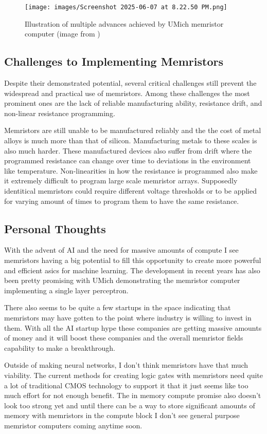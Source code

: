 \documentclass[sigconf]{acmart}
\begin{document}
\begin{figure}[h]
  \centering
  \texttt{[image: images/Screenshot 2025-06-07 at 8.22.50 PM.png]}
  \caption{Illustration of multiple advances achieved by UMich memristor computer (image from \cite{cai2019fully})}
\end{figure}

\subsection{Challenges to Implementing Memristors}
Despite their demonstrated potential, several critical challenges still
prevent the widespread and practical use of memristors. Among these challenges
the most prominent ones are the lack of reliable manufacturing ability,
resistance drift, and non-linear resistance programming. 

Memristors are still unable to be manufactured reliably and the 
the cost of metal alloys is much more than that of silicon. Manufacturing 
metals to these scales is also much harder. These manufactured devices also 
suffer from drift where the programmed resistance can change over time 
to deviations in the environment like temperature. Non-linearities 
in how the resistance is programmed also make it extremely difficult to
program large scale memristor arrays. Supposedly identitical memristors 
could require different voltage thresholds or to be applied for varying 
amount of times to program them to have the same resistance. 

\subsection{Personal Thoughts}
With the advent of AI and the need for massive amounts of compute 
I see memristors having a big potential to fill this opportunity 
to create more powerful and efficient asics for machine learning. 
The development in recent years has also been pretty promising with 
UMich demonstrating the memristor computer implementing a 
single layer perceptron. 

There also seems to be quite a few startups in the space
indicating that memristors may have gotten to the point where 
industry is willing to invest in them. With all the AI startup 
hype these companies are getting massive amounts of money 
and it will boost these companies and the overall memristor fields 
capability to make a breakthrough. 

Outside of making neural networks, I don't think memristors have 
that much viability. The current methods for creating logic gates 
with memristors need quite a lot of traditional CMOS technology to 
support it that it just seems like too much effort for not enough 
benefit. The in memory compute promise also doesn't look too strong
yet and until there can be a way to store significant amounts of memory with 
memristors in the compute block I don't see general purpose memristor 
computers coming anytime soon. 
\end{document}
